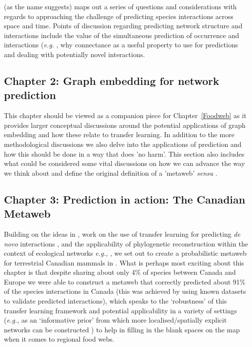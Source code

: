 \cite{Strydom2021RoaPre} (as the name suggests) maps out a series of questions
and considerations with regards to approaching the challenge of
predicting species interactions across space and time. Points of
discussion regarding predicting network structure and interactions
include the value of the simultaneous prediction of occurrence and
interactions (\emph{e.g.} \cite{Zurell2020TesSpe}, why connectance
as a useful property to use for predictions and dealing with 
potentially novel interactions.

\subsection{Chapter 2: Graph embedding for network prediction}

This chapter should be viewed as a companion piece for Chapter~\ref{Foodweb}
as it provides larger conceptual discussions around the potential
applications of graph embedding and how these relate to transfer
learning. In addition to the more methodological discussions we
also delve into the applications of prediction and how this should
be done in a way that does 'no harm'. This section also includes
what could be considered some vital discussions on how we can
advance the way we think about and define the original definition
of a 'metaweb' \emph{sensu} \cite{Dunne2006NetStr}.

\subsection{Chapter 3: Prediction in action: The Canadian
Metaweb}

Building on the ideas in \cite{Strydom2021RoaPre}, work on the use of 
transfer learning for predicting \emph{de novo} interactions
\cite{Runghen2021ExpNod}, and the applicability of phylogenetic
reconstruction within the context of ecological networks \emph{e.g.,}
\cite{Braga2021PhyRec}, we set out to create a probabilistic metaweb for
terrestrial Canadian mammals in \cite{Strydom2021FooWeb}. What is 
perhaps most exciting about this chapter is that despite sharing about
only 4\% of species between Canada and Europe
we were able to construct a metaweb that correctly predicted about 91\%
of the species interactions in Canada (this was achieved by using known
datasets to validate predicted interactions), which speaks to the
`robustness' of this transfer learning framework and potential
applicability in a variety of settings (\emph{e.g.,} as an `informative prior'
from which more localised/spatially explicit networks can be constructed
\cite{Cirtwill2019QuaFra}) to help in filling in the blank
spaces on the map when it comes to regional food webs.

